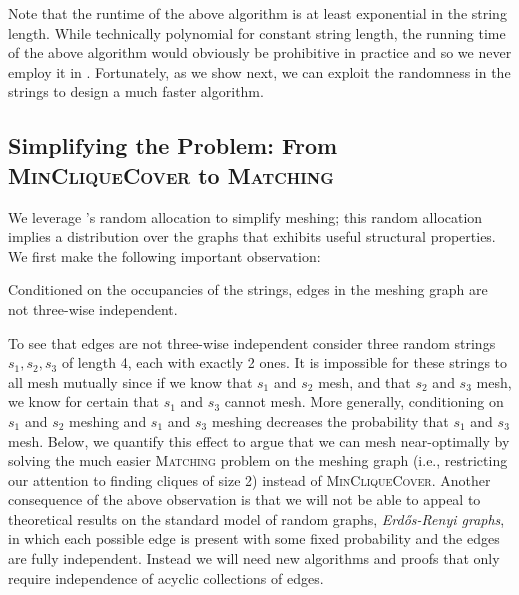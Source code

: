 Note that the runtime of the above algorithm is at least exponential in the string length. While technically polynomial for constant string length, the running time of the above algorithm would obviously be prohibitive in practice and so we never employ it in \Mesh{}. Fortunately, as we show next, we can exploit the randomness in the strings to design a much faster algorithm.

\subsection{Simplifying the Problem: From \textsc{MinCliqueCover} to \textsc{Matching}}
\label{subsec:matching}
We leverage \Mesh{}'s random allocation to simplify meshing; this random
allocation implies a distribution over the graphs that exhibits useful
structural properties. We first make the following important observation:

\begin{observation}
Conditioned on the occupancies of the strings, edges in the meshing graph  are not three-wise independent.
\end{observation}

To see that edges are not three-wise independent consider three random
strings $s_1, s_2, s_3$ of length 4, each with exactly 2 ones. It is
impossible for these strings to all mesh mutually since if we know that $s_1$ and $s_2$ mesh,
and that $s_2$ and $s_3$ mesh, we know for certain that $s_1$ and
$s_3$ cannot mesh. More generally, conditioning on $s_1$ and $s_2$
meshing and $s_1$ and $s_3$ meshing decreases the probability that
$s_1$ and $s_3$ mesh.
Below, we quantify this
effect to argue that we can mesh near-optimally by solving the much
easier \textsc{Matching} problem on the meshing graph (i.e.,
restricting our attention to finding cliques of size 2) instead of
\textsc{MinCliqueCover}. Another consequence of the above observation is that we will not be able to appeal to  theoretical results on the standard model of random graphs, \emph{Erd\H{o}s-Renyi graphs}, in which  each possible edge is present with some fixed probability and the edges are fully independent. Instead we will need new algorithms and proofs that only require independence of acyclic collections of edges.


